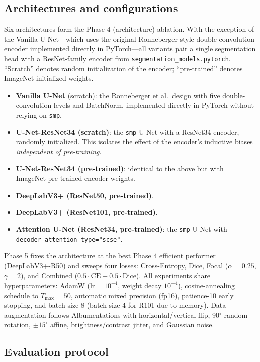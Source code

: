 \documentclass[conference,letterpaper,10pt]{IEEEtran}
\begin{document}
\subsection{Architectures and configurations}

Six architectures form the Phase 4 (architecture) ablation. With the
exception of the Vanilla U-Net---which uses the original
Ronneberger-style double-convolution encoder implemented directly in
PyTorch---all variants pair a single segmentation head with a
ResNet-family encoder from \texttt{segmentation\_models.pytorch}.
``Scratch'' denotes random initialization of the encoder;
``pre-trained'' denotes ImageNet-initialized weights.

\begin{itemize}
\item \textbf{Vanilla U-Net} (scratch): the Ronneberger et al.~design with
      five double-convolution levels and BatchNorm, implemented directly in
      PyTorch without relying on \texttt{smp}.
\item \textbf{U-Net-ResNet34 (scratch)}: the \texttt{smp} U-Net with a
      ResNet34 encoder, randomly initialized. This isolates the effect of
      the encoder's inductive biases \emph{independent of pre-training}.
\item \textbf{U-Net-ResNet34 (pre-trained)}: identical to the above but
      with ImageNet-pre-trained encoder weights.
\item \textbf{DeepLabV3+ (ResNet50, pre-trained)}.
\item \textbf{DeepLabV3+ (ResNet101, pre-trained)}.
\item \textbf{Attention U-Net (ResNet34, pre-trained)}: the \texttt{smp}
      U-Net with \texttt{decoder\_attention\_type="scse"}.
\end{itemize}

Phase 5 fixes the architecture at the best Phase 4 efficient performer
(DeepLabV3+-R50) and sweeps four losses: Cross-Entropy, Dice, Focal
($\alpha=0.25$, $\gamma=2$), and Combined
($0.5\cdot\text{CE} + 0.5\cdot\text{Dice}$). All experiments share hyperparameters:
AdamW ($\text{lr}=10^{-4}$, weight decay $10^{-4}$), cosine-annealing schedule
to $T_{\max}=50$, automatic mixed precision (fp16), patience-10 early
stopping, and batch size 8 (batch size 4 for R101 due to memory). Data
augmentation follows Albumentations with horizontal/vertical flip, 90$^\circ$
random rotation, $\pm15^\circ$ affine, brightness/contrast jitter, and
Gaussian noise.

\subsection{Evaluation protocol}
\end{document}
